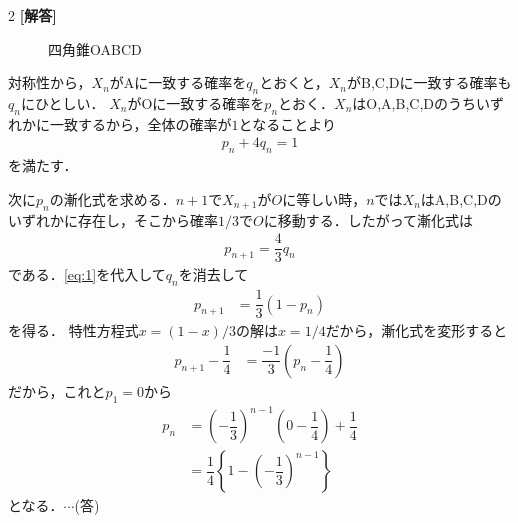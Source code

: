 \documentclass[../../main.tex]{subfiles}
\begin{document}
\setcounter{equation}{0}
\setcounter{figure}{0}
\setcounter{table}{0}
\begin{oframed}
  
\end{oframed}
\setlength{\columnseprule}{0.4pt}
\begin{multicols}{2}
  {\bf [解答]}

  \begin{figure}[H]
    \centering
    \caption{四角錐OABCD}
  \end{figure}

  対称性から，$X_n$がAに一致する確率を$q_n$とおくと，$X_n$がB,C,Dに一致する確率も$q_n$にひとしい．
  $X_n$がOに一致する確率を$p_n$とおく．$X_n$はO,A,B,C,Dのうちいずれかに一致するから，全体の確率が$1$となることより
  \begin{align}
    p_n + 4q_n = 1 \label{eq:1}
  \end{align}
  を満たす．

  次に$p_n$の漸化式を求める．$n+1$で$X_{n+1}$が$O$に等しい時，$n$では$X_n$はA,B,C,Dのいずれかに存在し，そこから確率$1/3$で$O$に移動する．したがって漸化式は
  \begin{align}
    p_{n+1} = \dfrac{4}{3}q_n
  \end{align}
  である．\cref{eq:1}を代入して$q_n$を消去して
  \begin{align}
    p_{n+1} & = \dfrac{1}{3}(1-p_n)
  \end{align}
  を得る．
  特性方程式$x = (1-x)/3$の解は$x = 1/4$だから，漸化式を変形すると
  \begin{align}
    p_{n+1}-\dfrac{1}{4} & = \dfrac{-1}{3}\left(p_n-\dfrac{1}{4}\right)
  \end{align}
  だから，これと$p_1=0$から
  \begin{align}
    p_n
    & = \left(-\dfrac{1}{3}\right)^{n-1}\left(0-\dfrac{1}{4}\right)+\dfrac{1}{4} \\
    & = \dfrac{1}{4}\left\{1-\left(-\dfrac{1}{3}\right)^{n-1}\right\}
  \end{align}
  となる．$\cdots$(答)


\end{multicols}
\end{document}
